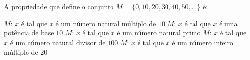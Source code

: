 A propriedade que define o conjunto $M=\{ 0,10,20,30,40,50,... \}$ é:

$M$: $x$ é tal que $x$ é um número natural múltiplo de $10$
$M$: $x$ é tal que $x$ é uma potência de base $10$
$M$: $x$ é tal que $x$ é um número natural primo
$M$: $x$ é tal que $x$ é um número natural divisor de $100$
$M$: $x$ é tal que $x$ é um número inteiro múltiplo de $20$





